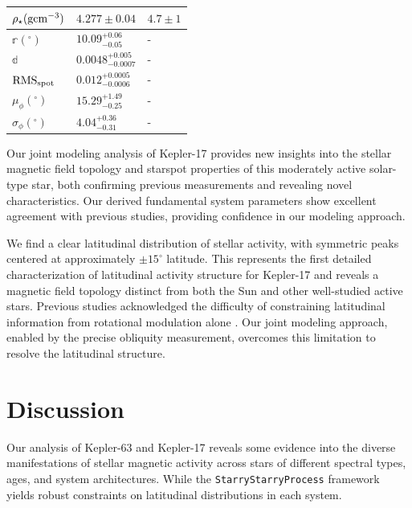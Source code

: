 \documentclass[twocolumn]{aastex631}
\begin{document}
\begin{table}[]
\begin{tabular}{lll}
    $\rho_\star (\rm gcm^{-3})$               & $4.277\pm0.04$                                     & $4.7\pm 1$                    \\ \hline
    $\mathbb{r} (^\circ)$                     & $10.09^{+0.06}_{-0.05}$                            &  -                   \\
    $\mathbb{d}$                              & $0.0048^{+0.005}_{-0.0007}$                        &  -                   \\
    $\rm RMS_{\rm spot}$                      & $0.012^{+0.0005}_{-0.0006}$                        &  -                   \\
    $\mu_\phi (^\circ)$                       & $15.29^{+1.49}_{-0.25}$                            &  -                   \\
    $\sigma_\phi (^\circ)$                    & $4.04^{+0.36}_{-0.31}$                               &  -                   \\ \hline
    \end{tabular}
    \vspace{0.3cm}
    
    \label{tab:ResultsKepler17}
\end{table}
%


Our joint modeling analysis of Kepler-17 provides new insights into the stellar magnetic field topology and starspot properties 
of this moderately active solar-type star, both confirming previous measurements and revealing novel characteristics.
Our derived fundamental system parameters show excellent agreement with previous studies, providing confidence in 
our modeling approach. 

We find a clear latitudinal distribution of stellar activity, with symmetric peaks centered at approximately 
$\pm 15^\circ$ latitude. This represents the first detailed characterization of latitudinal activity structure for Kepler-17 
and reveals a magnetic field topology distinct from both the Sun and other well-studied active stars. Previous studies 
acknowledged the difficulty of constraining latitudinal information from rotational modulation alone \citep{Bonomo2012}. 
Our joint modeling approach, enabled by the precise obliquity measurement, overcomes this limitation to resolve the 
latitudinal structure. 

\section{Discussion}
\label{sec:discussion}
Our analysis of Kepler-63 and Kepler-17 reveals some evidence into the diverse
manifestations of stellar magnetic activity across stars of different spectral types, ages, and
system architectures. While the \texttt{StarryStarryProcess} framework yields robust constraints
on latitudinal distributions in each system.
\end{document}
